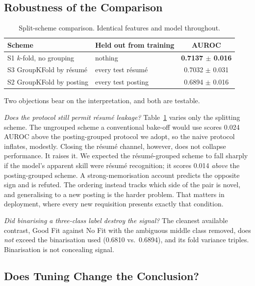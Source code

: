 \subsection{Robustness of the Comparison}
\label{sec:splitscheme}

\begin{table}[t]
\caption{Split-scheme comparison. Identical features and model throughout.}
\label{tab:splits}
\small
\begin{tabular}{@{}llc@{}}
\toprule
Scheme & Held out from training & AUROC \\
\midrule
S1 $k$-fold, no grouping & nothing & \textbf{0.7137 $\pm$ 0.016} \\
S3 GroupKFold by résumé  & every test résumé & 0.7032 $\pm$ 0.031 \\
S2 GroupKFold by posting & every test posting & 0.6894 $\pm$ 0.016 \\
\bottomrule
\end{tabular}
\end{table}

Two objections bear on the interpretation, and both are testable.

\emph{Does the protocol still permit résumé leakage?}
Table~\ref{tab:splits} varies only the splitting scheme. The ungrouped scheme a
conventional bake-off would use scores 0.024 AUROC above the posting-grouped
protocol we adopt, so the naive protocol inflates, modestly. Closing the résumé channel, however, does not collapse performance. It raises it. We expected the
résumé-grouped scheme to fall sharply if the model's apparent skill were résumé
recognition; it scores 0.014 \emph{above} the posting-grouped scheme. A
strong-memorisation account predicts the opposite sign and is refuted. The
ordering instead tracks which side of the pair is novel, and generalising to a new posting is the harder problem. That matters in deployment, where every new requisition presents exactly that condition.

\emph{Did binarising a three-class label destroy the signal?}
The cleanest available contrast, Good Fit against No Fit with the ambiguous
middle class removed, does \emph{not} exceed the binarisation used
(0.6810 vs.\ 0.6894), and its fold variance triples. Binarisation is not
concealing signal.

\subsection{Does Tuning Change the Conclusion?}
\label{sec:tuning}

